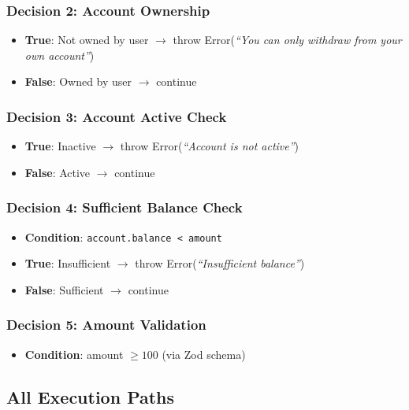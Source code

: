 \subsubsection{Decision 2: Account Ownership}
\begin{itemize}
    \item \textbf{True}: Not owned by user $\rightarrow$ throw Error(\textit{``You can only withdraw from your own account''})
    \item \textbf{False}: Owned by user $\rightarrow$ continue
\end{itemize}

\subsubsection{Decision 3: Account Active Check}
\begin{itemize}
    \item \textbf{True}: Inactive $\rightarrow$ throw Error(\textit{``Account is not active''})
    \item \textbf{False}: Active $\rightarrow$ continue
\end{itemize}

\subsubsection{Decision 4: Sufficient Balance Check}
\begin{itemize}
    \item \textbf{Condition}: \texttt{account.balance < amount}
    \item \textbf{True}: Insufficient $\rightarrow$ throw Error(\textit{``Insufficient balance''})
    \item \textbf{False}: Sufficient $\rightarrow$ continue
\end{itemize}

\subsubsection{Decision 5: Amount Validation}
\begin{itemize}
    \item \textbf{Condition}: amount $\geq 100$ (via Zod schema)
\end{itemize}

\subsection{All Execution Paths}

